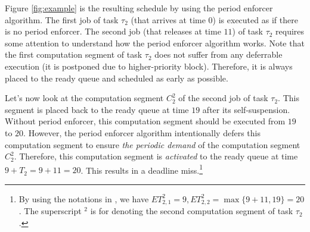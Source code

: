 Figure \ref{fig:example} is the resulting schedule by using the period enforcer algorithm. The first job of task $\tau_2$ (that arrives at time $0$) is executed as if there is no period enforcer. The second job (that releases at time $11$) of task $\tau_2$ requires some attention to understand how the period enforcer algorithm works. Note that the first computation segment of task $\tau_2$ does not suffer from any deferrable execution (it is postponed due to higher-priority block). Therefore, it is always placed to the ready queue and scheduled as early as possible.

Let's now look at the computation segment $C_2^2$ of the second job of task $\tau_2$. This segment is placed back to the ready queue at time $19$ after its self-suspension. Without period enforcer, this computation segment should be executed from $19$ to $20$. However, the period enforcer algorithm intentionally defers this computation segment to ensure \emph{the periodic demand} of the computation segment $C_2^2$. Therefore, this computation segment is \emph{activated} to the ready queue at time $9+T_2=9+11=20$. This results in a deadline miss.\footnote{By using the notations in \cite{Raj:suspension1991}, we have $ET_{2,1}^2=9, ET_{2,2}^2 = \max\{9+11, 19\}=20$. The superscript $^2$ is for denoting the second computation segment of task $\tau_2$.}




